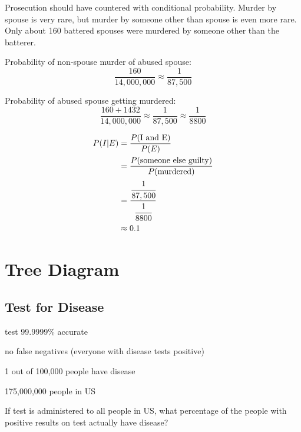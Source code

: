 \documentclass[landscape]{exam}
\begin{document}
  Prosecution should have countered with conditional probability. Murder by
  spouse is very rare, but murder by someone other than spouse is even more
  rare. Only about 160 battered spouses were murdered by someone other than
  the batterer.

  Probability of non-spouse murder of abused spouse:
  \[
    \frac{160}{14,000,000} \approx \frac{1}{87,500}
  \]

  Probability of abused spouse getting murdered:
  \[
    \frac{160 + 1432}{14,000,000} \approx \frac{1}{87,500} 
      \approx \frac{1}{8800}
  \]

  \begin{align*}
    P(I | E) & = \frac{P(\text{I and E})}{P(E)} \\
             & = \frac{P(\text{someone else guilty})}{P(\text{murdered})} \\
             & = \frac{\cfrac{1}{87,500}}{\cfrac{1}{8800}} \\
             & \approx 0.1 \\
  \end{align*}

  \section{Tree Diagram}
  \subsection{Test for Disease}

  \begin{itemize*}
    \item test 99.9999\% accurate
    \item no false negatives (everyone with disease tests positive)
    \item 1 out of 100,000 people have disease
    \item 175,000,000 people in US
  \end{itemize*}

  If test is administered to all people in US, what percentage of the people
  with positive results on test actually have disease?
\end{document}
